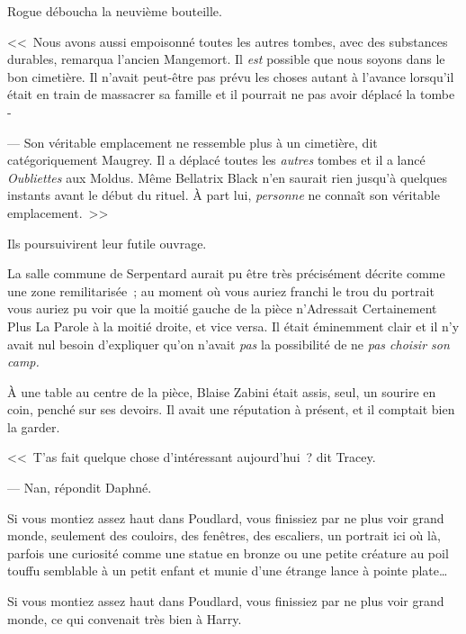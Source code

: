 Rogue déboucha la neuvième bouteille.

<<~Nous avons aussi empoisonné toutes les autres tombes, avec des substances durables, remarqua l'ancien Mangemort. Il \emph{est} possible que nous soyons dans le bon cimetière. Il n'avait peut-être pas prévu les choses autant à l'avance lorsqu'il était en train de massacrer sa famille et il pourrait ne pas avoir déplacé la tombe -

--- Son véritable emplacement ne ressemble plus à un cimetière, dit catégoriquement Maugrey. Il a déplacé toutes les \emph{autres} tombes et il a lancé \emph{Oubliettes} aux Moldus. Même Bellatrix Black n'en saurait rien jusqu'à quelques instants avant le début du rituel. À part lui, \emph{personne} ne connaît son véritable emplacement.~>>

Ils poursuivirent leur futile ouvrage.


La salle commune de Serpentard aurait pu être très précisément décrite comme une zone remilitarisée~; au moment où vous auriez franchi le trou du portrait vous auriez pu voir que la moitié gauche de la pièce n'Adressait Certainement Plus La Parole à la moitié droite, et vice versa. Il était éminemment clair et il n'y avait nul besoin d'expliquer qu'on n'avait \emph{pas} la possibilité de ne \emph{pas choisir son camp.}

À une table au centre de la pièce, Blaise Zabini était assis, seul, un sourire en coin, penché sur ses devoirs. Il avait une réputation à présent, et il comptait bien la garder.




<<~T'as fait quelque chose d'intéressant aujourd'hui~? dit Tracey.

--- Nan, répondit Daphné.


Si vous montiez assez haut dans Poudlard, vous finissiez par ne plus voir grand monde, seulement des couloirs, des fenêtres, des escaliers, un portrait ici où là, parfois une curiosité comme une statue en bronze ou une petite créature au poil touffu semblable à un petit enfant et munie d'une étrange lance à pointe plate…

Si vous montiez assez haut dans Poudlard, vous finissiez par ne plus voir grand monde, ce qui convenait très bien à Harry.


